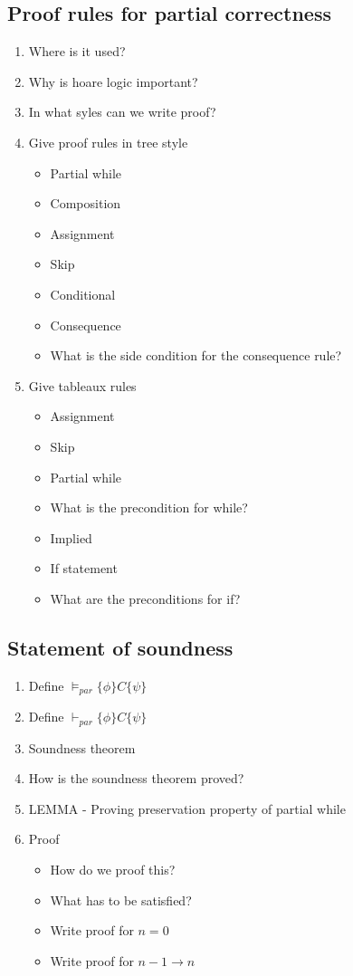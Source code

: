 \documentclass[fleqn]{article}
\begin{document}
\subsection{Proof rules for partial correctness}
\begin{enumerate}
    \item Where is it used?
    \item Why is hoare logic important?
    \item In what syles can we write proof?
    \item Give proof rules in tree style
    \begin{itemize}
        \item Partial while
        \item Composition 
        \item Assignment
        \item Skip
        \item Conditional
        \item Consequence 
        \item What is the side condition for the consequence rule?
    \end{itemize}
    \item Give tableaux rules
    \begin{itemize}
        \item Assignment
        \item Skip
        \item Partial while 
        \item What is the precondition for while?
        \item Implied
        \item If statement
        \item What are the preconditions for if?
    \end{itemize}
\end{enumerate}

\subsection{Statement of soundness}
\begin{enumerate}
    \item Define $\models_{par} \{ \phi \} C \{ \psi \}$
    \item Define $\vdash_{par} \{ \phi \} C \{ \psi \}$
    \item Soundness theorem
    \item How is the soundness theorem proved?
    \item LEMMA - Proving preservation property of partial while
    \item Proof
    \begin{itemize}
        \item How do we proof this?
        \item What has to be satisfied?
        \item Write proof for $n=0$
        \item Write proof for $n - 1 \rightarrow n$
    \end{itemize}
\end{enumerate}
\end{document}
